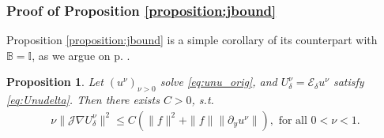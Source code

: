\documentclass[report]{elsarticle}
\newtheorem{proposition}[theorem]{Proposition}
\numberwithin{theorem}{section}
\begin{document}
\subsubsection{Proof of Proposition \ref{proposition:jbound}}
\label{sec:prop_jbound}
Proposition \ref{proposition:jbound} is a simple corollary of its counterpart with $\mathbb{B}=\mathbb{I}$, as we argue on p. \pageref{proof_prop_jbound}.
\begin{proposition}
	\label{proposition:jbound_basic}
	Let $(u^{\nu})_{\nu>0}$ solve \eqref{eq:unu_orig},  and $U^{\nu}_{\delta}=\mathcal{E}_{\delta}u^{\nu}$ satisfy \eqref{eq:Unudelta}. Then there exists $C>0$, s.t.  
	\begin{align}
		\label{eq:lemboundnu}
		\nu\|\mathcal{J}\nabla U^{\nu}_{\delta}\|^2\leq C \left(\|f\|^2+
		\|f\|\|\partial_y u^{\nu}\|\right), \text{ for all }0<\nu<1.
	\end{align}
\end{proposition}
\end{document}
